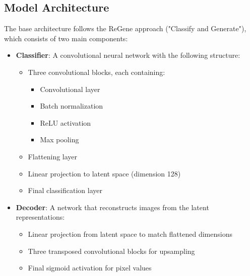 \documentclass{article}
\begin{document}
\label{appendix:model_architecture}

\subsection{Model Architecture}
The base architecture follows the ReGene approach ("Classify and Generate"), which consists of two main components:

\begin{itemize}
    \item \textbf{Classifier}: A convolutional neural network with the following structure:
    \begin{itemize}
        \item Three convolutional blocks, each containing:
        \begin{itemize}
            \item Convolutional layer
            \item Batch normalization
            \item ReLU activation
            \item Max pooling
        \end{itemize}
        \item Flattening layer
        \item Linear projection to latent space (dimension 128)
        \item Final classification layer
    \end{itemize}
    
    \item \textbf{Decoder}: A network that reconstructs images from the latent representations:
    \begin{itemize}
        \item Linear projection from latent space to match flattened dimensions
        \item Three transposed convolutional blocks for upsampling
        \item Final sigmoid activation for pixel values
    \end{itemize}
\end{itemize}
\end{document}

